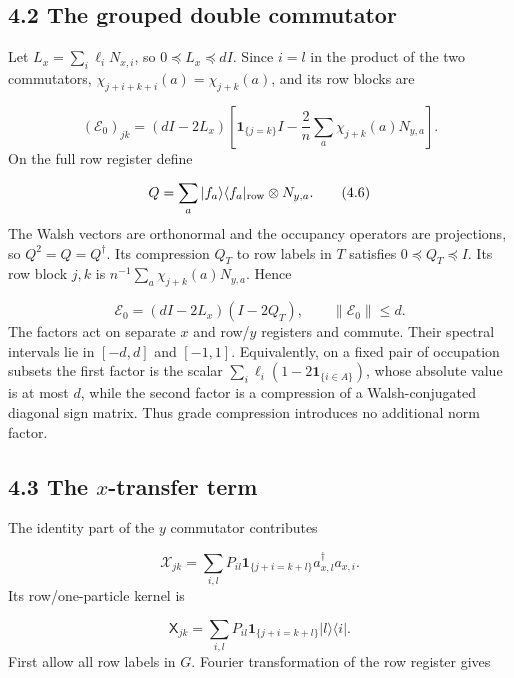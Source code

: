 \documentclass[11pt,a4paper]{article}
\begin{document}
\subsection*{4.2 The grouped double commutator}
Let \(L_x=\sum_i\ell_iN_{x,i}\), so \(0\preceq L_x\preceq dI\). Since \(i=l\) in the product of the two commutators, \(\chi_{j+i+k+i}(a)=\chi_{j+k}(a)\), and its row blocks are

\begin{equation}
(\mathcal E_0)_{jk}
=(dI-2L_x)\left[
\mathbf1_{\{j=k\}}I-\frac2n\sum_a\chi_{j+k}(a)N_{y,a}
\right].
\tag{4.5}
\end{equation}
On the full row register define

\begin{equation}
Q=\sum_a |f_a\rangle\langle f_a|_{\rm row}\otimes N_{y,a}.
\tag{4.6}
\end{equation}
The Walsh vectors are orthonormal and the occupancy operators are projections, so \(Q^2=Q=Q^\dagger\). Its compression \(Q_T\) to row labels in \(T\) satisfies \(0\preceq Q_T\preceq I\). Its row block \(j,k\) is \(n^{-1}\sum_a\chi_{j+k}(a)N_{y,a}\). Hence

\begin{equation}
\mathcal E_0=(dI-2L_x)(I-2Q_T),
\qquad \|\mathcal E_0\|\le d.
\tag{4.7}
\end{equation}
The factors act on separate \(x\) and row/\(y\) registers and commute. Their spectral intervals lie in \([-d,d]\) and \([-1,1]\). Equivalently, on a fixed pair of occupation subsets the first factor is the scalar \(\sum_i\ell_i(1-2\mathbf1_{\{i\in A\}})\), whose absolute value is at most \(d\), while the second factor is a compression of a Walsh-conjugated diagonal sign matrix. Thus grade compression introduces no additional norm factor.

\subsection*{4.3 The \(x\)-transfer term}
The identity part of the \(y\) commutator contributes

\begin{equation}
\mathcal X_{jk}
=\sum_{i,l}P_{il}\mathbf1_{\{j+i=k+l\}}
a_{x,l}^\dagger a_{x,i}.
\tag{4.8}
\end{equation}
Its row/one-particle kernel is

\begin{equation}
\mathsf X_{jk}
=\sum_{i,l}P_{il}\mathbf1_{\{j+i=k+l\}}
|l\rangle\langle i|.
\tag{4.9}
\end{equation}
First allow all row labels in \(G\). Fourier transformation of the row register gives
\end{document}
